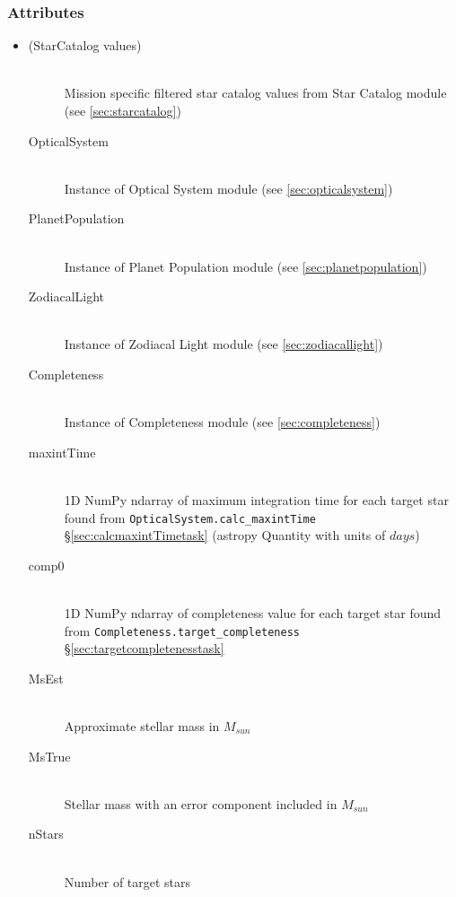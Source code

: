 \documentclass[cleanfoot]{asme2ej}
\begin{document}
\subsubsection*{Attributes}
\begin{itemize}
    \item 
    \begin{description}
        \item[(StarCatalog values)] \hfill \\
        Mission specific filtered star catalog values from Star Catalog module (see \ref{sec:starcatalog})
        \item[OpticalSystem] \hfill \\
        Instance of Optical System module (see \ref{sec:opticalsystem})
        \item[PlanetPopulation] \hfill \\
        Instance of Planet Population module (see \ref{sec:planetpopulation})
        \item[ZodiacalLight] \hfill \\
        Instance of Zodiacal Light module (see \ref{sec:zodiacallight})
        \item[Completeness] \hfill \\
        Instance of Completeness module (see \ref{sec:completeness})
        \item[maxintTime] \hfill \\
        1D NumPy ndarray of maximum integration time for each target star found from \verb+OpticalSystem.calc_maxintTime+ \S\ref{sec:calcmaxintTimetask} (astropy Quantity with units of $days$)
        \item[comp0] \hfill \\
        1D NumPy ndarray of completeness value for each target star found from \verb+Completeness.target_completeness+ \S\ref{sec:targetcompletenesstask}
        \item[MsEst] \hfill \\
        Approximate stellar mass in $ M_{sun} $
        \item[MsTrue] \hfill \\
        Stellar mass with an error component included in $ M_{sun} $
        \item[nStars] \hfill \\
        Number of target stars
    \end{description}
\end{itemize}

\end{document}
